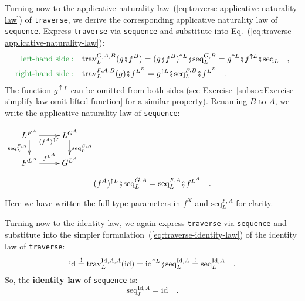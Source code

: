 Turning now to the applicative naturality law~(\ref{eq:traverse-applicative-naturality-law})
of \lstinline!traverse!, we derive the corresponding applicative
naturality law of \lstinline!sequence!. Express \lstinline!traverse!
via \lstinline!sequence! and substitute into Eq.~(\ref{eq:traverse-applicative-naturality-law}):
\begin{align*}
{\color{greenunder}\text{left-hand side}:}\quad & \text{trav}_{L}^{G,A,B}(g\bef f^{B})=(g\bef f^{B})^{\uparrow L}\bef\text{seq}_{L}^{G,B}=g^{\uparrow L}\bef f^{\uparrow L}\bef\text{seq}_{L}\quad,\\
{\color{greenunder}\text{right-hand side}:}\quad & \text{trav}_{L}^{F,A,B}(g)\bef f^{L^{B}}=g^{\uparrow L}\bef\text{seq}_{L}^{F,B}\bef f^{L^{B}}\quad.
\end{align*}
The function $g^{\uparrow L}$ can be omitted from both sides (see
Exercise~\ref{subsec:Exercise-simplify-law-omit-lifted-function}
for a similar property). Renaming $B$ to $A$, we write the applicative
naturality law
of \lstinline!sequence!:
\begin{center}
$\xymatrix{\xyScaleY{1.5pc}\xyScaleX{2.0pc}L^{F^{A}}\ar[d]\sb(0.45){\text{seq}_{L}^{F,A}}\ar[r]\sb(0.5){(f^{A})^{\uparrow L}} & L^{G^{A}}\ar[d]\sp(0.45){\text{seq}_{L}^{G,A}}\\
F^{L^{A}}\ar[r]\sp(0.5){f^{L^{A}}} & G^{L^{A}}
}
$
\par\end{center}

\[
(f^{A})^{\uparrow L}\bef\text{seq}_{L}^{G,A}=\text{seq}_{L}^{F,A}\bef f^{L^{A}}\quad.
\]

\noindent Here we have written the full type parameters in $f^{X}$
and $\text{seq}_{L}^{F,A}$ for clarity.

Turning now to the identity law, we again express \lstinline!traverse!
via \lstinline!sequence! and substitute into the simpler formulation~(\ref{eq:traverse-identity-law})
of the identity law of \lstinline!traverse!:
\[
\text{id}\overset{!}{=}\text{trav}_{L}^{\text{Id},A,A}(\text{id})=\text{id}^{\uparrow L}\bef\text{seq}_{L}^{\text{Id},A}\overset{!}{=}\text{seq}_{L}^{\text{Id},A}\quad.
\]
So, the \textbf{identity law} of \lstinline!sequence!
is:
\begin{equation}
\text{seq}_{L}^{\text{Id},A}=\text{id}\quad.\label{eq:identity-law-of-sequence}
\end{equation}

